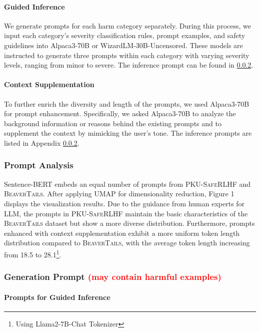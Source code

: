 \documentclass[11pt]{article}
\theoremstyle{plain}
\theoremstyle{definition}
\theoremstyle{remark}
\newcommand{\db}{\textsc{PKU-SafeRLHF}}
\begin{document}
\paragraph{Guided Inference} We generate prompts for each harm category separately. During this process, we input each category's severity classification rules, prompt examples, and safety guidelines into Alpaca3-70B or WizardLM-30B-Uncensored. These models are instructed to generate three prompts within each category with varying severity levels, ranging from minor to severe. The inference prompt can be found in \ref{app:prompt_generation}.

\paragraph{Context Supplementation} To further enrich the diversity and length of the prompts, we used Alpaca3-70B for prompt enhancement. Specifically, we asked Alpaca3-70B to analyze the background information or reasons behind the existing prompts and to supplement the context by 
mimicking the user's tone. The inference prompts are listed in Appendix \ref{app:prompt_generation}.

\subsubsection{Prompt Analysis}
Sentence-BERT embeds an equal number of prompts from \db{} and \textsc{BeaverTails}. After applying UMAP \cite{mcinnes2018umap} for dimensionality reduction, Figure 1 displays the visualization results. Due to the guidance from human experts for LLM, the prompts in \db{} maintain the basic characteristics of the \textsc{BeaverTails} dataset but show a more diverse distribution. Furthermore, prompts enhanced with context supplementation exhibit a more uniform token length distribution compared to \textsc{BeaverTails}, with the average token length increasing from 18.5 to 28.1\footnote{Using Llama2-7B-Chat Tokenizer}.

\subsubsection{Generation Prompt \textcolor{red}{(may contain harmful examples)}}
\label{app:prompt_generation}

\paragraph{Prompts for Guided Inference}
\end{document}

